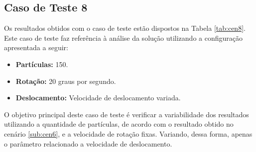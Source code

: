 \subsection{Caso de Teste 8}
\label{sub:cen8}

Os resultados obtidos com o caso de teste estão dispostos na Tabela \ref{tab:cen8}. Este caso de teste faz referência à análise da solução
utilizando a configuração apresentada a seguir:

\begin{itemize}
  \item \textbf{Partículas:} 150.
  \item \textbf{Rotação:} 20 graus por segundo.
  \item \textbf{Deslocamento:} Velocidade de deslocamento variada.
\end{itemize}

O objetivo principal deste caso de teste é verificar a variabilidade dos resultados utilizando a quantidade de partículas, de
acordo com o resultado obtido no cenário \ref{sub:cen6}, e a velocidade de rotação fixas. Variando, dessa forma, apenas
o parâmetro relacionado a velocidade de deslocamento.

